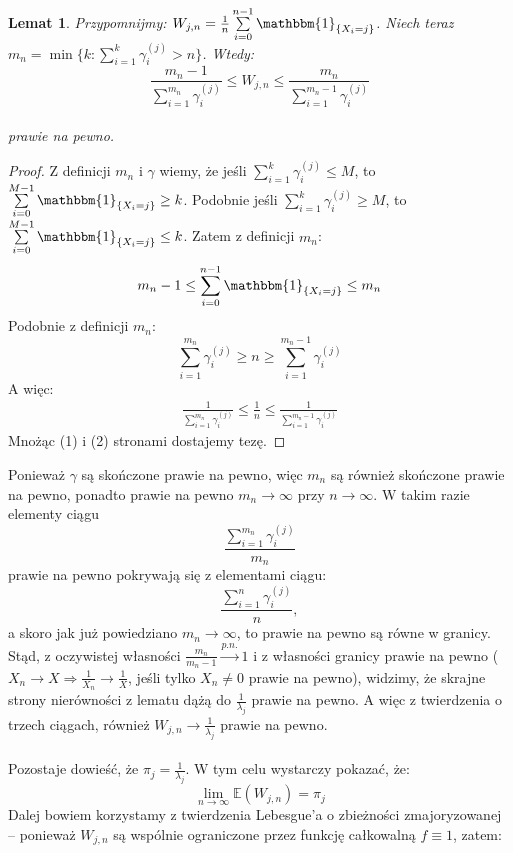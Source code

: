 \documentclass[a4paper]{article}
\theoremstyle{defn}
\theoremstyle{theorem}
\theoremstyle{lemma}
\newtheorem{lemma}[defn]{Lemat}
\theoremstyle{cor}
\theoremstyle{fact}
\begin{document}
\begin{lemma}\label{lemma2.5.12}
Przypomnijmy: $W_{j, n} = \frac{1}{n}\sum\limits_{i = 0}^{n-1} \mathbbm{1}_{\{X_i = j\}}$. Niech teraz $m_n = \min \{k: \sum\limits_{i=1}^k \gamma_i^{(j)} > n\}$. Wtedy:
$$ \frac{m_n - 1}{\sum\limits_{i=1}^{m_n} \gamma_i^{(j)}} \leq W_{j, n}  \leq \frac{m_n}{\sum\limits_{i=1}^{m_n-1} \gamma_i^{(j)}}$$\\
prawie na pewno.
\end{lemma}
\begin{proof}
Z definicji $m_n$ i $\gamma$ wiemy, że jeśli $\sum\limits_{i=1}^k \gamma_i^{(j)} \leq M$, to $\sum\limits_{i = 0}^{M-1} \mathbbm{1}_{\{X_i = j\}} \geq k$. Podobnie jeśli $\sum\limits_{i=1}^k \gamma_i^{(j)} \geq M$, to $\sum\limits_{i = 0}^{M-1} \mathbbm{1}_{\{X_i = j\}} \leq k$. Zatem z definicji $m_n$:
\begin{align}
m_n - 1 \leq \sum\limits_{i = 0}^{n-1} \mathbbm{1}_{\{X_i = j\}} \leq m_n
\end{align}
Podobnie z definicji $m_n$:
$$\sum\limits_{i=1}^{m_n} \gamma_i^{(j)} \geq n \geq \sum\limits_{i=1}^{m_n - 1} \gamma_i^{(j)}$$
A więc:
\begin{align}
     \frac{1}{\sum\limits_{i=1}^{m_n} \gamma_i^{(j)}} \leq \frac{1}{n} \leq \frac{1}{\sum\limits_{i=1}^{m_n - 1} \gamma_i^{(j)}}
\end{align}
Mnożąc (1) i (2) stronami dostajemy tezę.
\end{proof}
Ponieważ $\gamma$ są skończone prawie na pewno, więc $m_n$ są również skończone prawie na pewno, ponadto prawie na pewno $m_n \to \infty$ przy $n \to \infty$. W takim razie elementy ciągu
$$\frac{\sum\limits_{i=1}^{m_n} \gamma_i^{(j)}}{m_n}$$
prawie na pewno pokrywają się z elementami ciągu:
$$\frac{\sum\limits_{i=1}^{n} \gamma_i^{(j)}}{n},$$
a skoro jak już powiedziano $m_n \to \infty$, to prawie na pewno są równe w granicy.
Stąd, z oczywistej własności $\frac{m_n}{m_n-1} \overset{p.n.}{\to} 1$ i z własności granicy prawie na pewno ($ X_n \to X \Rightarrow \frac{1}{X_n} \to \frac{1}{X}$, jeśli tylko $X_n \neq 0$ prawie na pewno), widzimy, że skrajne strony nierówności z lematu dążą do $\frac{1}{\lambda_j}$ prawie na pewno. A więc z twierdzenia o trzech ciągach, również $W_{j,n} \to \frac{1}{\lambda_j}$ prawie na pewno.\\
\\
Pozostaje dowieść, że $\pi_j = \frac{1}{\lambda_j}$. W tym celu wystarczy pokazać, że:
$$ \lim\limits_{n \to \infty} \mathbb{E}(W_{j,n}) = \pi_j$$ Dalej bowiem korzystamy z twierdzenia Lebesgue'a o zbieżności zmajoryzowanej – ponieważ $W_{j,n}$ są wspólnie ograniczone przez funkcję całkowalną $f \equiv 1$, zatem:
\end{document}

